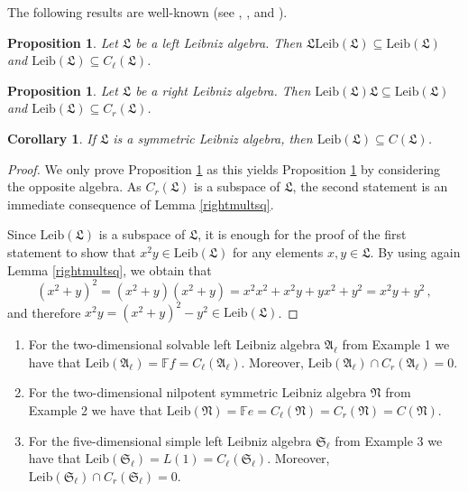 \documentclass{amsart}
\newtheorem{pro}[thm]{Proposition}
\newtheorem{cor}[thm]{Corollary}
\numberwithin{equation}{section}
\newcommand{\leib}{\mathrm{Leib}}
\newcommand{\F}{\mathbb{F}}
\newcommand{\af}{\mathfrak{A}}
\newcommand{\Sf}{\mathfrak{S}}
\newcommand{\lf}{\mathfrak{L}}
\newcommand{\nf}{\mathfrak{N}}
\begin{document}
The following results are well-known (see \cite[Proposition 1\,(a)]{C}, \cite[Proposition~1.1.4]{Co},
and \cite[Lemma 1.3 and its proof]{B2}).

\begin{pro}\label{leftker}
Let $\lf$ be a left Leibniz algebra. Then $\lf\leib(\lf)\subseteq\leib(\lf)$ and $\leib(\lf)\subseteq
C_\ell(\lf)$.
\end{pro}

\begin{pro}\label{rightker}
Let $\lf$ be a right Leibniz algebra. Then $\leib(\lf)\lf\subseteq\leib(\lf)$ and $\leib(\lf)\subseteq
C_r(\lf)$.
\end{pro}

\begin{cor}\label{kercen}
If $\lf$ is a symmetric Leibniz algebra, then $\leib(\lf)\subseteq C(\lf)$.
\end{cor}

\begin{proof}
We only prove Proposition \ref{rightker} as this yields Proposition \ref{leftker} by considering the
opposite algebra. As $C_r(\lf)$ is a subspace of $\lf$, the second statement is an immediate
consequence of Lemma \ref{rightmultsq}.

Since $\leib(\lf)$ is a subspace of $\lf$, it is enough for the proof of the first statement to show
that $x^2y\in\leib(\lf)$ for any elements $x,y\in\lf$. By using again Lemma \ref{rightmultsq},
we obtain that $$(x^2+y)^2=(x^2+y)(x^2+y)=x^2x^2+x^2y+yx^2+y^2=x^2y+y^2\,,$$
and therefore $x^2y=(x^2+y)^2-y^2\in\leib(\lf)$.
\end{proof}

\begin{enumerate}
\item[(1)] For the two-dimensional solvable left Leibniz algebra $\af_\ell$ from Example 1 we
                have that $\leib(\af_\ell)=\F f=C_\ell(\af_\ell)$. Moreover, $\leib(\af_\ell)\cap C_r
                (\af_\ell)=0$.
\item[(2)] For the two-dimensional nilpotent symmetric Leibniz algebra $\nf$ from Example 2
                we have that $\leib(\nf)=\F e=C_\ell(\nf)=C_r(\nf)=C(\nf)$.
\item[(3)] For the five-dimensional simple left Leibniz algebra $\Sf_\ell$ from Example 3 we
                have that $\leib(\Sf_\ell)=L(1)=C_\ell(\Sf_\ell)$. Moreover, $\leib(\Sf_\ell)\cap C_r
                (\Sf_\ell)=0$.
\end{enumerate}
\vspace{.2cm}
\end{document}
